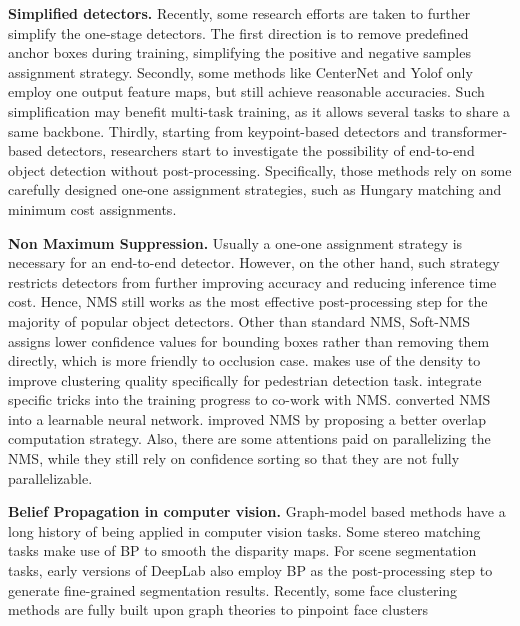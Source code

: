 \documentclass[10pt,twocolumn,letterpaper]{article}
\begin{document}
\textbf{Simplified detectors.} Recently, some research efforts are taken to further simplify the one-stage detectors.
The first direction is to remove predefined anchor boxes during training, simplifying the positive and negative samples assignment strategy\cite{law2018cornernet,tian2019fcos,zhou2019objects,carion2020end,peize2020onenet}.
Secondly, some methods like CenterNet\cite{zhou2019objects} and Yolof\cite{chen2021you} only employ one output feature maps, but still achieve reasonable accuracies. Such simplification may benefit multi-task training, as it allows several tasks to share a same backbone.
Thirdly, starting from keypoint-based detectors\cite{law2018cornernet,zhou2019objects,lan2020saccadenet} and transformer-based detectors\cite{carion2020end,zhu2020deformable}, researchers start to investigate the possibility of end-to-end object detection without post-processing. Specifically, those methods rely on some carefully designed one-one assignment strategies, such as Hungary matching\cite{carion2020end} and minimum cost assignments\cite{peize2020onenet}.

\textbf{Non Maximum Suppression.} Usually a one-one assignment strategy is necessary for an end-to-end detector. However, on the other hand, such strategy restricts detectors from further improving accuracy and reducing inference time cost.
Hence, NMS still works as the most effective post-processing step for the majority of popular object detectors. Other than standard NMS, Soft-NMS \cite{bodla2017soft} assigns lower confidence values for bounding boxes rather than removing them directly, which is more friendly to occlusion case.
\cite{liu2019adaptive} makes use of the density to improve clustering quality specifically for pedestrian detection task. \cite{he2019bounding,jiang2018acquisition} integrate specific tricks into the training progress to co-work with NMS. \cite{learnnms} converted NMS into a learnable neural network. \cite{zheng2020distance} improved NMS by proposing a better overlap computation strategy.
Also, there are some attentions paid on parallelizing the NMS\cite{zheng2021enhancing,bolya2019yolact}, while they still rely on confidence sorting so that they are not fully parallelizable.

\textbf{Belief Propagation in computer vision.} Graph-model based methods have a long history of being applied in computer vision tasks. Some stereo matching tasks\cite{yang2010constant,xiang2012real} make use of BP to smooth the disparity maps.
For scene segmentation tasks, early versions of DeepLab\cite{chen2014semantic} also employ BP as the post-processing step to generate fine-grained segmentation results. Recently, some face clustering methods are fully built upon graph theories to pinpoint face clusters \cite{yang2019learning}
\end{document}
